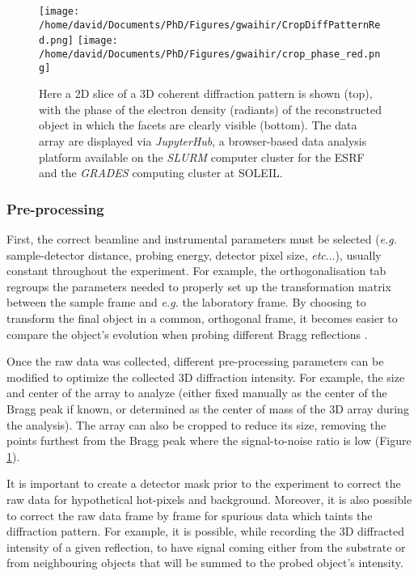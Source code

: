 \begin{figure}[!htb]
    \centering
    \texttt{[image: /home/david/Documents/PhD/Figures/gwaihir/CropDiffPatternRed.png]}
    \texttt{[image: /home/david/Documents/PhD/Figures/gwaihir/crop\_phase\_red.png]}
    \caption{
    Here a 2D slice of a 3D coherent diffraction pattern is shown (top), with the phase of the electron density (radiants) of the reconstructed object in which the facets are clearly visible (bottom). The data array are displayed via \textit{JupyterHub}, a browser-based data analysis platform available on the \textit{SLURM} computer cluster for the ESRF and the \textit{GRADES} computing cluster at SOLEIL.
    }
    \label{fig:GUI_file}
\end{figure}

\subsubsection{Pre-processing}
First, the correct beamline and instrumental parameters must be selected (\textit{e.g.} sample-detector distance, probing energy, detector pixel size, \textit{etc}...), usually constant throughout the experiment. For example, the orthogonalisation tab regroups the parameters needed to properly set up the transformation matrix between the sample frame and \textit{e.g.} the laboratory frame. By choosing to transform the final object in a common, orthogonal frame, it becomes easier to compare the object's evolution when probing different Bragg reflections \cite{crystal_sarah}.

Once the raw data was collected, different pre-processing parameters can be modified to optimize the collected 3D diffraction intensity. For example, the size and center of the array to analyze (either fixed manually as the center of the Bragg peak if known, or determined as the center of mass of the 3D array during the analysis). The array can also be cropped to reduce its size, removing the points furthest from the Bragg peak where the signal-to-noise ratio is low (Figure \ref{fig:GUI_file}).

It is important to create a detector mask prior to the experiment to correct the raw data for hypothetical hot-pixels and background.
Moreover, it is also possible to correct the raw data frame by frame for spurious data which taints the diffraction pattern.
For example, it is possible, while recording the 3D diffracted intensity of a given reflection, to have signal coming either from the substrate or from neighbouring objects that will be summed to the probed object's intensity.

